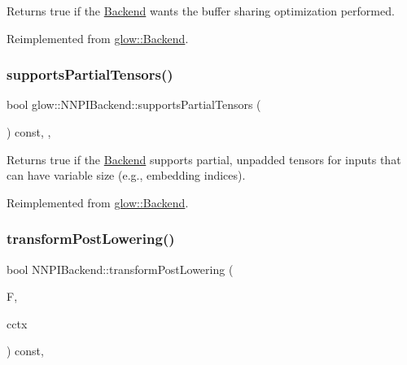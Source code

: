 \begin{DoxyReturn}{Returns}
true if the \hyperlink{classglow_1_1_backend}{Backend} wants the buffer sharing optimization performed. 
\end{DoxyReturn}


Reimplemented from \hyperlink{classglow_1_1_backend_a5314d00d2739dca36279cd70b4a01145}{glow\+::\+Backend}.

\mbox{\label{classglow_1_1_n_n_p_i_backend_a83a437d7624740427aa1aa650e381576}} 
\subsubsection{\texorpdfstring{supports\+Partial\+Tensors()}{supportsPartialTensors()}}
{\footnotesize\ttfamily bool glow\+::\+N\+N\+P\+I\+Backend\+::supports\+Partial\+Tensors (\begin{DoxyParamCaption}{ }\end{DoxyParamCaption}) const\hspace{0.3cm}{\ttfamily [inline]}, {\ttfamily [override]}, {\ttfamily [virtual]}}

\begin{DoxyReturn}{Returns}
true if the \hyperlink{classglow_1_1_backend}{Backend} supports partial, unpadded tensors for inputs that can have variable size (e.\+g., embedding indices). 
\end{DoxyReturn}


Reimplemented from \hyperlink{classglow_1_1_backend_a930556ce803696ca2ffe8d66c9ba5401}{glow\+::\+Backend}.

\mbox{\label{classglow_1_1_n_n_p_i_backend_ac467449ebb66b2a44d41da66180d7d91}} 
\subsubsection{\texorpdfstring{transform\+Post\+Lowering()}{transformPostLowering()}}
{\footnotesize\ttfamily bool N\+N\+P\+I\+Backend\+::transform\+Post\+Lowering (\begin{DoxyParamCaption}\item[{\hyperlink{classglow_1_1_function}{Function} $\ast$}]{F,  }\item[{\hyperlink{structglow_1_1_compilation_context}{Compilation\+Context} \&}]{cctx }\end{DoxyParamCaption}) const\hspace{0.3cm}{\ttfamily [override]}, {\ttfamily [virtual]}}

